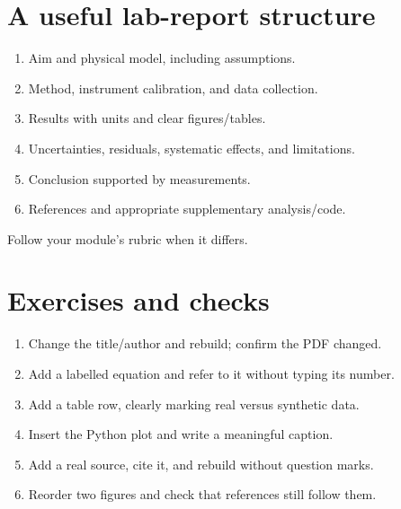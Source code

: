 \documentclass[11pt]{article}
\begin{document}
\section{A useful lab-report structure}
\begin{enumerate}
\item Aim and physical model, including assumptions.
\item Method, instrument calibration, and data collection.
\item Results with units and clear figures/tables.
\item Uncertainties, residuals, systematic effects, and limitations.
\item Conclusion supported by measurements.
\item References and appropriate supplementary analysis/code.
\end{enumerate}
Follow your module's rubric when it differs.

\section{Exercises and checks}
\begin{enumerate}
\item Change the title/author and rebuild; confirm the PDF changed.
\item Add a labelled equation and refer to it without typing its number.
\item Add a table row, clearly marking real versus synthetic data.
\item Insert the Python plot and write a meaningful caption.
\item Add a real source, cite it, and rebuild without question marks.
\item Reorder two figures and check that references still follow them.
\end{enumerate}
\end{document}

